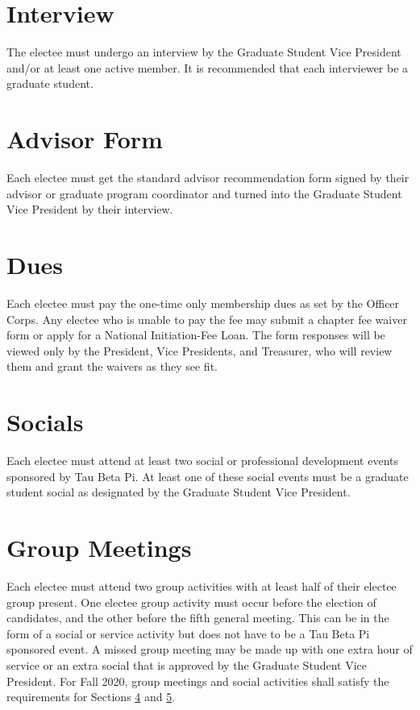 \section{Interview}	The electee must undergo an interview by the Graduate Student Vice President and/or at least one active member. It is recommended that each interviewer be a graduate student. 
\section{Advisor Form}	Each electee must get the standard advisor recommendation form signed by their advisor or graduate program coordinator and turned into the Graduate Student Vice President by their interview.
\section{Dues}	Each electee must pay the one-time only membership dues as set by the Officer Corps. Any electee who is unable to pay the fee may submit a chapter fee waiver form or apply for a National Initiation-Fee Loan. The form responses will be viewed only by the President, Vice Presidents, and Treasurer, who will review them and grant the waivers as they see fit.
\section{Socials}\label{sec:grsocialreq}	Each electee must attend at least two social  or professional development events sponsored by Tau Beta Pi.  At least one of these social events must be a graduate student social as designated by the Graduate Student Vice President. %
\section{Group Meetings} \label{grad_group_meetings} Each electee must attend two group activities with at least half of their electee group present. One electee group activity must occur before the election of candidates, and the other before the fifth general meeting. This can be in the form of a social or service activity but does not have to be a Tau Beta Pi sponsored event. A missed group meeting may be made up with one extra hour of service or an extra social that is approved by the Graduate Student Vice President. For Fall 2020, group meetings and social activities shall satisfy the requirements for Sections \ref{sec:grsocialreq} and \ref{grad_group_meetings}.


